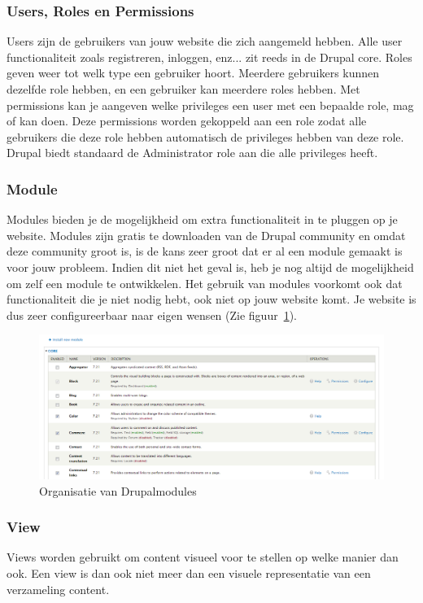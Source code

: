 \subsubsection{Users, Roles en Permissions}
Users zijn de gebruikers van jouw website die zich aangemeld hebben. Alle user functionaliteit zoals registreren, inloggen, enz... zit reeds in de Drupal core. Roles geven weer tot welk type een gebruiker hoort. Meerdere gebruikers kunnen dezelfde role hebben, en een gebruiker kan meerdere roles hebben. Met permissions kan je aangeven welke privileges een user met een bepaalde role, mag of kan doen. Deze permissions worden gekoppeld aan een role zodat alle gebruikers die deze role hebben automatisch de privileges hebben van deze role. Drupal biedt standaard de Administrator role aan die alle privileges heeft.

\newpage

\subsubsection{Module}
Modules bieden je de mogelijkheid om extra functionaliteit in te pluggen op je website. Modules zijn gratis te downloaden van de Drupal community en omdat deze community groot is, is de kans zeer groot dat er al een module gemaakt is voor jouw probleem. Indien dit niet het geval is, heb je nog altijd de mogelijkheid om zelf een module te ontwikkelen. Het gebruik van modules voorkomt ook dat functionaliteit die je niet nodig hebt, ook niet op jouw website komt. Je website is dus zeer configureerbaar naar eigen wensen (Zie figuur~\ref{fig:drupalOrganizeModules}).
\begin{figure}[h]
\includegraphics[width=1\textwidth]{fig/drupalOrganizeModules}
\caption{Organisatie van Drupalmodules}
\label{fig:drupalOrganizeModules}
\end{figure}

\subsubsection{View}
Views worden gebruikt om content visueel voor te stellen op welke manier dan ook. Een view is dan ook niet meer dan een visuele representatie van een verzameling content.

